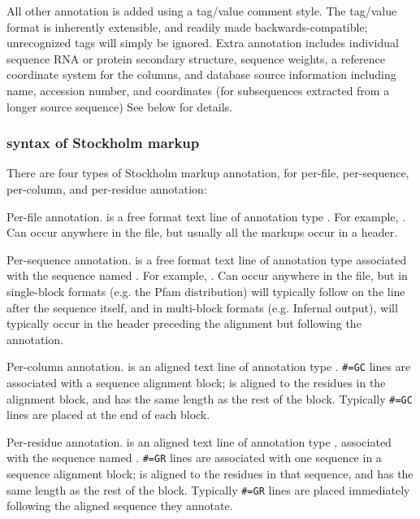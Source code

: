All other annotation is added using a tag/value comment style. The
tag/value format is inherently extensible, and readily made
backwards-compatible; unrecognized tags will simply be ignored. Extra
annotation includes individual sequence RNA or protein secondary
structure, sequence weights, a reference coordinate system for the
columns, and database source information including name, accession
number, and coordinates (for subsequences extracted from a longer
source sequence) See below for details.

\subsubsection{syntax of Stockholm markup}

There are four types of Stockholm markup annotation, for per-file,
per-sequence, per-column, and per-residue annotation:

\begin{sreitems}{}
\item [\emprog{\#=GF <tag> <s>}]
        Per-file annotation.  is a free format text line
        of annotation type . For example, . Can occur anywhere in the file, but usually
        all the  markups occur in a header.

\item [\emprog{\#=GS <seqname> <tag> <s>}]
        Per-sequence annotation.  is a free format text line
        of annotation type  associated with the sequence
        named . For example, . Can occur anywhere
        in the file, but in single-block formats (e.g. the Pfam
        distribution) will typically follow on the line after the
        sequence itself, and in multi-block formats (e.g. Infernal
        output), will typically occur in the header preceding the
        alignment but following the  annotation.

\item [\emprog{\#=GC <tag> <..s..>}]
        Per-column annotation.  is an aligned text line
        of annotation type .
        \verb+#=GC+ lines are
        associated with a sequence alignment block; 
        is aligned to the residues in the alignment block, and has
        the same length as the rest of the block.
        Typically \verb+#=GC+ lines are placed at the end of each block.

\item [\emprog{\#=GR <seqname> <tag> <..s..>}]
        Per-residue annotation.  is an aligned text line
        of annotation type , associated with the sequence
        named . 
        \verb+#=GR+ lines are 
        associated with one sequence in a sequence alignment block; 
        is aligned to the residues in that sequence, and has
        the same length as the rest of the block.
        Typically
        \verb+#=GR+ lines are placed immediately following the
        aligned sequence they annotate.
\end{sreitems}

